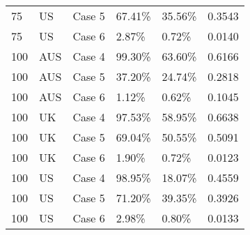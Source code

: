 \begin{table}[ht]
\begin{tabular}{llllll}
  75 & US & Case 5 & 67.41\% & 35.56\% & 0.3543 \\ 
  75 & US & Case 6 & 2.87\% & 0.72\% & 0.0140 \\ 
  100 & AUS & Case 4 & 99.30\% & 63.60\% & 0.6166 \\ 
  100 & AUS & Case 5 & 37.20\% & 24.74\% & 0.2818 \\ 
  100 & AUS & Case 6 & 1.12\% & 0.62\% & 0.1045 \\ 
  100 & UK & Case 4 & 97.53\% & 58.95\% & 0.6638 \\ 
  100 & UK & Case 5 & 69.04\% & 50.55\% & 0.5091 \\ 
  100 & UK & Case 6 & 1.90\% & 0.72\% & 0.0123 \\ 
  100 & US & Case 4 & 98.95\% & 18.07\% & 0.4559 \\ 
  100 & US & Case 5 & 71.20\% & 39.35\% & 0.3926 \\ 
  100 & US & Case 6 & 2.98\% & 0.80\% & 0.0133 \\ 
   \hline
\end{tabular}
\end{table}
